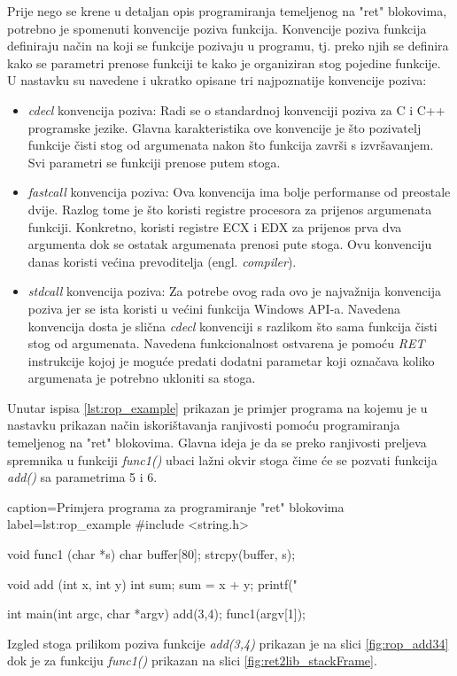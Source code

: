 \documentclass[times, utf8, diplomski, numeric]{fer}
\begin{document}
Prije nego se krene u detaljan opis programiranja temeljenog na
"ret" blokovima, potrebno  je spomenuti konvencije poziva
funkcija. Konvencije poziva funkcija definiraju način na koji se
funkcije pozivaju u programu, tj. preko njih se definira kako se
parametri prenose funkciji te kako je organiziran stog pojedine
funkcije. U nastavku su navedene i ukratko opisane tri
najpoznatije konvencije poziva:

\begin{itemize}

\item \emph{cdecl} konvencija poziva: Radi se o standardnoj
konvenciji poziva za C i C++ programske jezike. Glavna
karakteristika ove konvencije je što pozivatelj funkcije čisti
stog od argumenata nakon što funkcija završi s izvršavanjem. Svi
parametri se funkciji prenose putem stoga.

\item \emph{fastcall} konvencija poziva: Ova konvencija ima bolje
performanse od preostale dvije. Razlog tome je što koristi
registre procesora za prijenos argumenata funkciji. Konkretno,
koristi registre ECX i EDX za prijenos prva dva argumenta dok se
ostatak argumenata prenosi pute stoga. Ovu konvenciju danas
koristi većina prevoditelja (engl. \emph{compiler}).

\item \emph{stdcall} konvencija poziva: Za potrebe ovog rada ovo
je najvažnija konvencija poziva jer se ista koristi u većini
funkcija Windows API-a. Navedena konvencija dosta je slična
\emph{cdecl} konvenciji s razlikom što sama funkcija čisti stog
od argumenata. Navedena funkcionalnost ostvarena je pomoću
\emph{RET} instrukcije kojoj je moguće predati dodatni parametar
koji označava koliko argumenata je potrebno ukloniti sa stoga.
\end{itemize}

Unutar ispisa \ref{lst:rop_example} prikazan je primjer
programa na kojemu je u nastavku prikazan način iskorištavanja
ranjivosti pomoću programiranja temeljenog na "ret" blokovima.
Glavna ideja je da se preko ranjivosti preljeva spremnika u
funkciji \emph{func1()} ubaci lažni okvir stoga čime će se
pozvati funkcija \emph{add()} sa parametrima 5 i 6.
 
\begin{ispis} {caption=Primjera programa za programiranje "ret" blokovima} {label=lst:rop_example}
#include <string.h>
 
void func1 (char *s) { char buffer[80]; strcpy(buffer, s); }

void add (int x, int y)
{
	int sum;
	sum = x + y;
	printf("%
}

int main(int argc, char *argv)
{
	add(3,4);
	func1(argv[1]);
}
\end{ispis}
Izgled stoga prilikom poziva funkcije \emph{add(3,4)} prikazan je na slici \ref{fig:rop_add34} dok je za funkciju \emph{func1()} prikazan na slici \ref{fig:ret2lib_stackFrame}.
\end{document}
